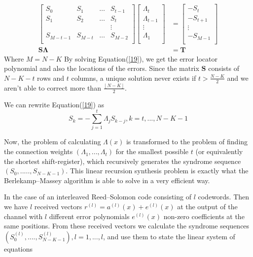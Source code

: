 \documentclass[fontsize=12pt]{article}
\begin{document}
\begin{equation}
\begin{split}
\begin{bmatrix}
    S_{0}       &  S_{1} & \dots &  S_{t-1} \\
    S_{1}       &  S_{2} &  \dots &  S_{t} \\
    &&&\vdots{} \\
    S_{M-t-1}  &  S_{M-t} &  \dots &   S_{M-2} \\
\end{bmatrix}
\begin{bmatrix}
    \Lambda_{t}\\
    \Lambda_{t-1}\\
    \vdots{}\\
    \Lambda_{1}\\
\end{bmatrix}
&=
\begin{bmatrix}
     -S_{t}\\
    -S_{t+1}\\
    \vdots{}\\
    -S_{M-1}\\
\end{bmatrix}\\
\mathbf{S}\mathbf{\Lambda}&=\mathbf{T}
\end{split}
\label{19}
\end{equation}
Where $M=N-K$
By solving Equation(\ref{19}), we get the error locator polynomial and also the locations of the errors. Since the matrix $\mathbf{S}$ consists of $N-K-t$ rows and $t$ columns, a unique solution never exists if $t > \frac{N-K}{2}$ and we aren't able to correct more than $\frac{\left \lfloor{N - K} \right \rfloor}{2}$. 

We can rewrite Equation(\ref{19}) as 
\begin{equation}
S_k = -\sum_{j=1}^{t} \Lambda_jS_{k-j}, k=t,...,N-K-1
\end{equation}

Now, the problem of calculating $\Lambda(x)$ is transformed to the
problem of finding the connection weights $(\Lambda_1,...,\Lambda_t)$ for
the smallest possible $t$ (or equivalently the shortest shift-register),
which recursively generates the syndrome sequence $(S_0,.....,S_{N-K-1})$. This linear recursion synthesis problem is exactly what the Berlekamp–Massey algorithm is able to solve in a very efficient way.

In the case of an interleaved Reed–Solomon
code consisting of $l$ codewords. Then we have $l$ received
vectors $r^(l)=a^(l)(x)+e^(l)(x)$ at the output of the channel
with $l$ different error polynomials $e^(l)(x)$ non-zero
coefficients at the same positions. From these received vectors
we calculate the syndrome sequences $(S^{(\mathit{l})}_0,....,S^{(\mathit{l})}_{N-K-1}), \mathit{l}=1,...,l$,  and use them to state the linear system of equations
\end{document}
